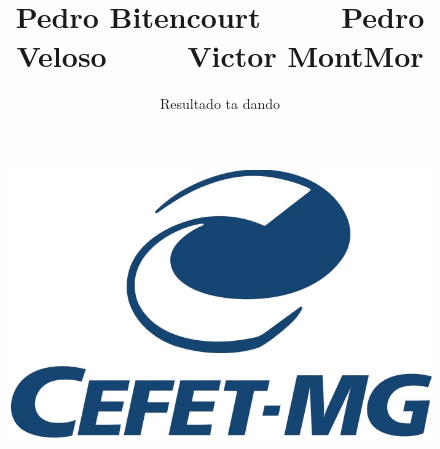 \documentclass{article}
\title{Pedro Bitencourt\ \ \ \ \  Pedro Veloso\ \ \ \ \  Victor MontMor}
\author{Resultado ta dando}
\date{}
\begin{document}
\begin{figure}[t]
\includegraphics[scale=0.4]{cefet.jpg}
\centering
\end{figure}
\maketitle




\clearpage
\end{document}
